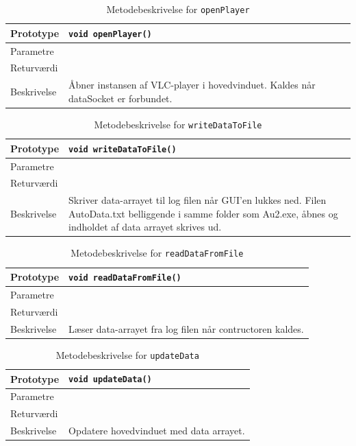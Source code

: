 \begin{table}[H]
\begin{tabularx}{\textwidth}{| L{2.5 cm} | Z |} \hline
Prototype & \texttt{void openPlayer()} \\\hline
Parametre &  \\\hline
Returværdi &  \\\hline
Beskrivelse & Åbner instansen af VLC-player i hovedvinduet. Kaldes når dataSocket er forbundet.  \\\hline
\end{tabularx}
\caption{Metodebeskrivelse for \texttt{openPlayer}}
\label{table:met_openPlayer}
\end{table}

\begin{table}[H]
\begin{tabularx}{\textwidth}{| L{2.5 cm} | Z |} \hline
Prototype & \texttt{void writeDataToFile()} \\\hline
Parametre &  \\\hline
Returværdi &  \\\hline
Beskrivelse & Skriver data-arrayet til log filen når GUI'en lukkes ned. Filen AutoData.txt belliggende i samme folder som Au2.exe, åbnes og indholdet af data arrayet skrives ud.  \\\hline
\end{tabularx}
\caption{Metodebeskrivelse for \texttt{writeDataToFile}}
\label{table:met_writeDataToFile}
\end{table}

\begin{table}[H]
\begin{tabularx}{\textwidth}{| L{2.5 cm} | Z |} \hline
Prototype & \texttt{void readDataFromFile()} \\\hline
Parametre &  \\\hline
Returværdi &  \\\hline
Beskrivelse & Læser data-arrayet fra log filen når contructoren kaldes.  \\\hline
\end{tabularx}
\caption{Metodebeskrivelse for \texttt{readDataFromFile}}
\label{table:met_readDataFromFile}
\end{table}

\begin{table}[H]
\begin{tabularx}{\textwidth}{| L{2.5 cm} | Z |} \hline
Prototype & \texttt{void updateData()} \\\hline
Parametre &  \\\hline
Returværdi &  \\\hline
Beskrivelse & Opdatere hovedvinduet med data arrayet. \\\hline
\end{tabularx}
\caption{Metodebeskrivelse for \texttt{updateData}}
\label{table:met_updateData}
\end{table}

\clearpage

